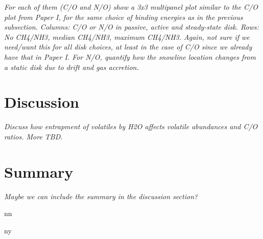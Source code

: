 \documentclass[apj]{emulateapj}
\newcommand\bibinc{n}		%
\newcommand{\emgr}[1]{\emph{ \color{gray} #1}}
\begin{document}
\emgr{For each of them (C/O and N/O) show a 3x3 multipanel plot similar to the C/O plot from Paper I, for the same choice of binding energies as in the previous subsection. Columns: C/O or N/O in passive, active and steady-state disk. Rows: No CH4/NH3, median CH4/NH3, maximum CH4/NH3. Again, not sure if we need/want this for all disk choices, at least in the case of C/O since we already have that in Paper I. For N/O, quantify how the snowline location changes from a static disk due to drift and gas accretion.}

\section{Discussion}

\emgr{Discuss how entrapment of volatiles by H2O affects volatile abundances and C/O ratios. More TBD.}

\section{Summary}

\emgr{Maybe we can include the summary in the discussion section?}






\if\bibinc n

\fi

\if\bibinc y
\begin{thebibliography}
\end{thebibliography}
\fi
\end{document}
